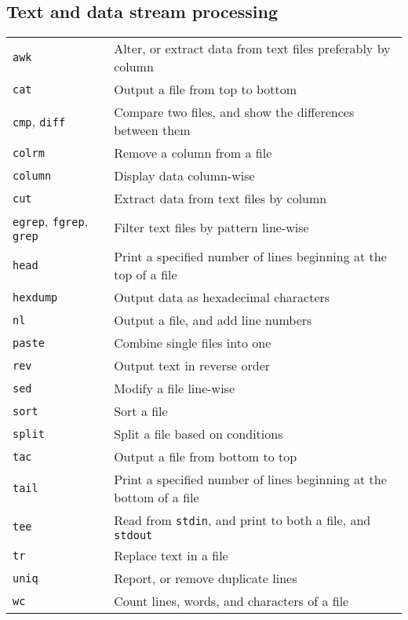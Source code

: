 \documentclass[10pt]{article}
\begin{document}
\begin{multicols}{2}
\section{Text and data stream processing}
\begin{tabular}{ p{2.5cm} p{8.5cm} }
  \hline
  \texttt{awk} & Alter, or extract data from text files preferably by column\\
  \rowcolor{Gray}
  \texttt{cat} & Output a file from top to bottom \\
  \texttt{cmp}, \texttt{diff} & Compare two files, and show the differences between them\\
  \rowcolor{Gray}
  \texttt{colrm} & Remove a column from a file \\
  \texttt{column} & Display data column-wise \\
  \rowcolor{Gray}
  \texttt{cut} & Extract data from text files by column \\
  \texttt{egrep}, \texttt{fgrep}, \texttt{grep} & Filter text files by pattern line-wise \\
  \rowcolor{Gray}
  \texttt{head} & Print a specified number of lines beginning at  the top of a file\\
  \texttt{hexdump} & Output data as hexadecimal characters\\
  \rowcolor{Gray}
  \texttt{nl} & Output a file, and add line numbers\\
  \texttt{paste} & Combine single files into one \\
  \rowcolor{Gray}
  \texttt{rev} & Output text in reverse order \\
  \texttt{sed} & Modify a file line-wise \\
  \rowcolor{Gray}
  \texttt{sort} & Sort a file \\
  \texttt{split} & Split a file based on conditions\\
  \rowcolor{Gray}
  \texttt{tac} & Output a file from bottom to top\\
  \texttt{tail} & Print a specified number of lines beginning at the bottom of a file\\
  \rowcolor{Gray}
  \texttt{tee} & Read from \texttt{stdin}, and print to both a file, and \texttt{stdout}\\
  \texttt{tr} & Replace text in a file\\
  \rowcolor{Gray}
  \texttt{uniq} & Report, or remove duplicate lines \\
  \texttt{wc} & Count lines, words, and characters of a file\\
  \hline
\end{tabular}


\end{multicols}
\end{document}
